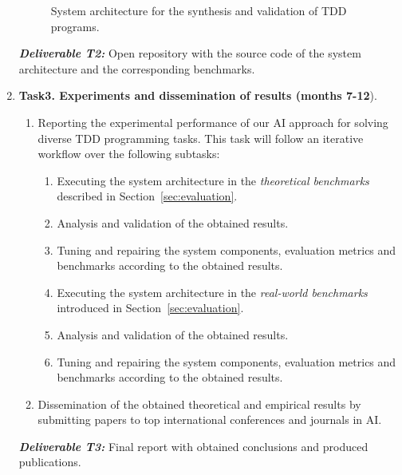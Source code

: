 \documentclass[10pt,a4paper]{paper}
\begin{document}
\begin{enumerate}
\begin{figure}[hbt!]
\begin{center}
\end{center}  
\caption{\small System architecture for the synthesis and validation of TDD programs.}
\label{fig:architecture}
\end{figure}

{\small{\bf\em Deliverable T2:} Open repository with the source code of the system architecture and the corresponding benchmarks.}
    
\item {\bf Task3. Experiments and dissemination of results (months 7-12}).
   \begin{small}
      \begin{enumerate}
      \item Reporting the experimental performance of our AI approach for solving diverse TDD programming tasks. This task will follow an iterative workflow over the following subtasks:
      \begin{enumerate}
      \item Executing the system architecture in the {\em theoretical benchmarks} described in Section~\ref{sec:evaluation}.
      \item Analysis and validation of the obtained results.
      \item Tuning and repairing the system components, evaluation metrics and benchmarks according to the obtained results.                 
      \item Executing the system architecture in the {\em real-world benchmarks} introduced in Section~\ref{sec:evaluation}.
      \item Analysis and validation of the obtained results.         
      \item Tuning and repairing the system components, evaluation metrics and benchmarks according to the obtained results.                 
      \end{enumerate}
      \item Dissemination of the obtained theoretical and empirical results by submitting papers to top international conferences and journals in AI.        
      \end{enumerate}
\end{small}        
{\small{\bf\em  Deliverable T3:} Final report with obtained conclusions and produced publications.}
\end{enumerate}
\end{document}
